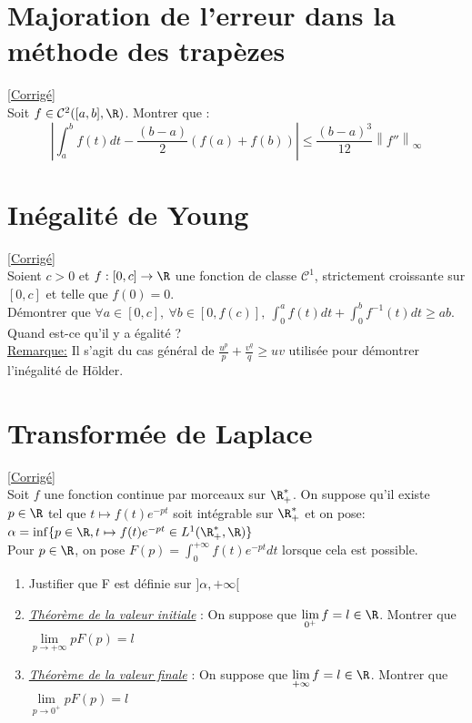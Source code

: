 \documentclass{book}
\begin{document}
	\section{Majoration de l'erreur dans la méthode des trapèzes }
	\textcolor{blue}{\hyperref[sec:majoration-de-lerreur-dans-la-methode-des-trapezes]{[Corrigé]}}\\
	\label{trapèze}
	\label{Majoration de l'erreur dans la méthode des trapèzes}
	Soit $f \in \mathcal{C}^2([a,b],\R)$. Montrer que : $$\left| \int_a^b f(t)dt-\frac{(b-a)}{2}(f(a)+f(b))\right| \leq \frac{(b-a)^3}{12}\left\|f''\right\|_\infty$$
	
	\section{Inégalité de Young }
	\textcolor{blue}{\hyperref[sec:inegalite-de-young-etoile2]{[Corrigé]}}\\
	\label{young}
	\label{Inégalité de Young}
	Soient $c>0$ et $f:[0,c] \to \R$ une fonction de classe $\mathcal C^1$, strictement croissante sur $[0,c]$ et telle que $f(0)=0$.
	\\Démontrer que $\forall a\in [0,c],\ \forall b\in [0,f(c)],\ \displaystyle\int_0^a f(t)dt +\int_0^b f^{-1}(t)dt\geq ab$.
	\\Quand est-ce qu'il y a égalité ?
	\\ \underline{Remarque:} Il s'agit du cas général de $\displaystyle\frac{u^p}{p}+\displaystyle\frac{v^q}{q} \geq uv$ utilisée pour démontrer l'inégalité de Hölder.
	
	\section{Transformée de Laplace }
	\textcolor{blue}{\hyperref[sec:transformee-de-laplace]{[Corrigé]}}\\
	\label{laplace}
	\label{Transformée de Laplace}
	Soit $f$ une fonction continue par morceaux sur $\R_+^*$. On suppose qu'il existe $p\in\R$ tel que $t\longmapsto f(t)e^{-pt}$ soit intégrable sur $\R^*_+$ et on pose: $\alpha=\inf \{p\in\R,t \mapsto f(t)e^{-pt} \in L^1(\R^*_+,\R)\}$
	\\Pour $p\in\R$, on pose $F(p)=\displaystyle\int_0^{+\infty} f(t)e^{-pt}dt$ lorsque cela est possible.
	\begin{enumerate}[leftmargin=*]
		\item Justifier que F est définie sur $]\alpha,+\infty[$
		\item \textit{\underline{Théorème de la valeur initiale}} : On suppose que $\lim\limits_{0^+} f=l\in\R$. Montrer que $\lim\limits_{p \to +\infty} pF(p)=l$
		\item \textit{\underline{Théorème de la valeur finale}} : On suppose que $\lim\limits_{+\infty}f=l\in\R$. Montrer que $\lim\limits_{p\to 0^+} pF(p)=l$
	\end{enumerate}
	
\end{document}
